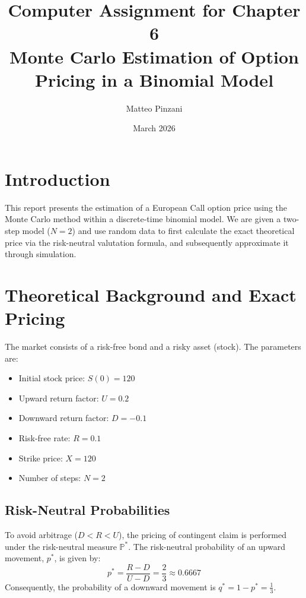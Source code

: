 \documentclass[12pt, a4paper]{article}
\title{Computer Assignment for Chapter 6 \\ \large Monte Carlo Estimation of Option Pricing in a Binomial Model}
\author{Matteo Pinzani}
\date{March 2026}
\begin{document}
\maketitle

\section{Introduction}
This report presents the estimation of a European Call option price using the Monte Carlo method within a discrete-time binomial model. We are given a two-step model ($N = 2$) and use random data to first calculate the exact theoretical price via the risk-neutral valutation formula, and subsequently approximate it through simulation.

\section{Theoretical Background and Exact Pricing}
The market consists of a risk-free bond and a risky asset (stock). The parameters are:
\begin{itemize}
    \item Initial stock price: $S(0) = 120$
    \item Upward return factor: $U = 0.2$
    \item Downward return factor: $D = -0.1$
    \item Risk-free rate: $R = 0.1$
    \item Strike price: $X = 120$
    \item Number of steps: $N = 2$
\end{itemize}

\subsection{Risk-Neutral Probabilities}
To avoid arbitrage ($D < R < U$), the pricing of contingent claim is performed under the risk-neutral measure $\mathbb{P}^*$. The risk-neutral probability of an upward movement, $p^*$, is given by:
\begin{equation}
    p^* = \frac{R - D}{U - D} = \frac{2}{3} \approx 0.6667
\end{equation}
Consequently, the probability of a downward movement is $q^* = 1 - p^* = \frac{1}{3}$.
\end{document}
